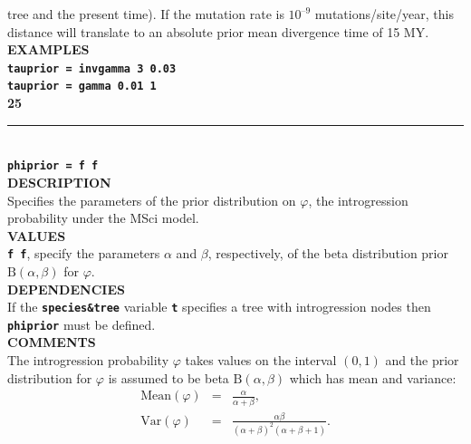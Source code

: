 \documentclass[a4paper]{book}
\numberwithin{equation}{section} \renewcommand{\baselinestretch}{0.55}
\begin{document}
tree and the present time).  If the mutation rate is $10^{–9}$
mutations/site/year, this distance will translate to an
absolute prior mean divergence time of 15 MY. \vspace{5pt}\\
\textbf{EXAMPLES} \vspace{5pt}\\
\textbf{\texttt{tauprior = invgamma 3 0.03}} \vspace{5pt}\\
\textbf{\texttt{tauprior = gamma 0.01 1}}\vspace{10pt}\\
\textbf{{\large 25}} \\
\noindent\rule{\textwidth}{0.8pt} \\
\textbf{{\Large \texttt{phiprior = f f}}} \vspace{5pt}\\
\textbf{DESCRIPTION} \vspace{5pt}\\
Specifies the parameters of the prior distribution on $\varphi$, the
introgression probability under the MSci model.
\vspace{5pt}\\
\textbf{VALUES} \vspace{5pt}\\
\textbf{\texttt{f f}}, specify the parameters $\alpha$ and $\beta$, respectively, of the beta distribution prior $\textrm{B}(\alpha,\beta)$ for $\varphi$. \vspace{5pt}\\
\textbf{DEPENDENCIES} \vspace{5pt}\\
If the \textbf{\texttt{species\&tree}} variable \textbf{\texttt{t}}
specifies a tree with introgression nodes then
\textbf{\texttt{phiprior}} must be defined.
\vspace{5pt}\\
\textbf{COMMENTS} \vspace{5pt}\\
The introgression probability $\varphi$ takes values on the interval
$(0,1)$ and the prior distribution for $\varphi$ is assumed to be beta
$\textrm{B}(\alpha, \beta)$ which has mean and variance:
\begin{eqnarray}
  \textrm{Mean}(\varphi) & = & \frac{\alpha}{\alpha+\beta}, \nonumber \\
  \textrm{Var}(\varphi) & = & \frac{\alpha \beta}{(\alpha + \beta)^2 (\alpha + \beta + 1)}. \nonumber
\end{eqnarray}
\end{document}
